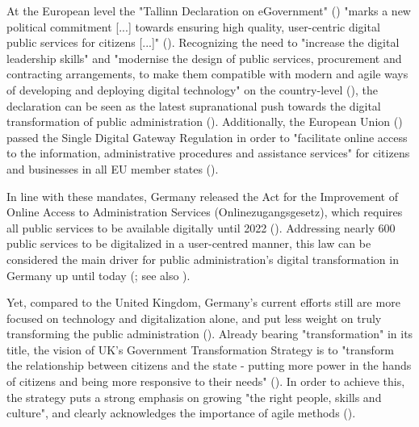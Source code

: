At the European level the "Tallinn Declaration on eGovernment" (\cite*{EuropeanCommission2017}) "marks a new political commitment [...] towards ensuring high quality, user-centric digital public services for citizens [...]" (\cite{EuropeanCommission2017a}). Recognizing the need to "increase the digital leadership skills" and "modernise the design of public services, procurement and contracting arrangements, to make them compatible with modern and agile ways of developing and deploying digital technology" on the country-level (\cite[p. 7]{EuropeanCommission2017}), the declaration can be seen as the latest supranational push towards the digital transformation of public administration (\cite{Mergel2019a}). Additionally, the European Union (\cite*{EuropeanUnion2018}) passed the Single Digital Gateway Regulation in order to "facilitate online access to the information, administrative procedures and assistance services" for citizens and businesses in all EU member states (\cite{EuropeanCommission2018a}).\par 
In line with these mandates, Germany released the Act for the Improvement of Online Access to Administration Services (Onlinezugangsgesetz), which requires all public services to be available digitally until 2022 (\cite{DeutscherBundestag2017}). Addressing nearly 600 public services to be digitalized in a user-centred manner, this law can be considered the main driver for public administration's digital transformation in Germany up until today (\cite{Mergel2019, BundesministeriumdesInnerenfurBauundHeimat2017}; see also \cite{EuropeanCommission2019a}).\par 
Yet, compared to the United Kingdom, Germany's current efforts still are more focused on technology and digitalization alone, and put less weight on truly transforming the public administration (\cite{Mergel2019, EuropeanCommission2019b}). Already bearing "transformation" in its title, the vision of UK's Government Transformation Strategy is to "transform the relationship between citizens and the state - putting more power in the hands of citizens and being more responsive to their needs" (\cite{CabinetOffice2017}). In order to achieve this, the strategy puts a strong emphasis on growing "the right people, skills and culture", and clearly acknowledges the importance of agile methods (\cite{CabinetOffice2017}).\par 


